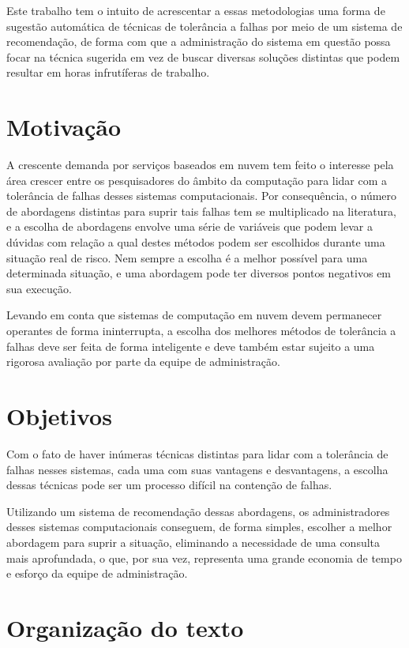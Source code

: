 \documentclass[
	12pt,				%
	oneside,			%
	a4paper,			%
	chapter=TITLE,		%
	english,			%
	french,				%
	spanish,			%
	brazil				%
	]{abntex2}
\begin{document}
Este trabalho tem o intuito de acrescentar a essas metodologias uma forma de sugestão automática de técnicas de tolerância a falhas por meio de um sistema de recomendação, de forma com que a administração do sistema em questão possa focar na técnica sugerida em vez de buscar diversas soluções distintas que podem resultar em horas infrutíferas de trabalho.

\section{Motivação}

A crescente demanda por serviços baseados em nuvem tem feito o interesse pela área crescer entre os pesquisadores do âmbito da computação para lidar com a tolerância de falhas desses sistemas computacionais. Por consequência, o número de abordagens distintas para suprir tais falhas tem se multiplicado na literatura, e a escolha de abordagens envolve uma série de variáveis que podem levar a dúvidas com relação a qual destes métodos podem ser escolhidos durante uma situação real de risco. Nem sempre a escolha é a melhor possível para uma determinada situação, e uma abordagem pode ter diversos pontos negativos em sua execução.

Levando em conta que sistemas de computação em nuvem devem permanecer operantes de forma ininterrupta, a escolha dos melhores métodos de tolerância a falhas deve ser feita de forma inteligente e deve também estar sujeito a uma rigorosa avaliação por parte da equipe de administração.

\section{Objetivos}

Com o fato de haver inúmeras técnicas distintas para lidar com a tolerância de falhas nesses sistemas, cada uma com suas vantagens e desvantagens, a escolha dessas técnicas pode ser um processo difícil na contenção de falhas.

Utilizando um sistema de recomendação dessas abordagens, os administradores desses sistemas computacionais conseguem, de forma simples, escolher a melhor abordagem para suprir a situação, eliminando a necessidade de uma consulta mais aprofundada, o que, por sua vez, representa uma grande economia de tempo e esforço da equipe de administração.

\section{Organização do texto}
\end{document}
